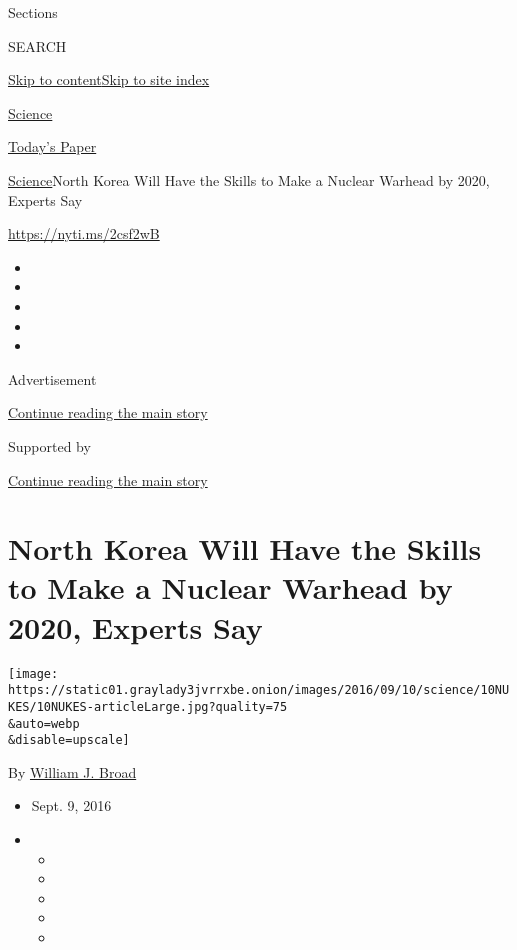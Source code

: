 Sections

SEARCH

\protect\hyperlink{site-content}{Skip to
content}\protect\hyperlink{site-index}{Skip to site index}

\href{https://www.nytimes3xbfgragh.onion/section/science}{Science}

\href{https://myaccount.nytimes3xbfgragh.onion/auth/login?response_type=cookie\&client_id=vi}{}

\href{https://www.nytimes3xbfgragh.onion/section/todayspaper}{Today's
Paper}

\href{/section/science}{Science}\textbar{}North Korea Will Have the
Skills to Make a Nuclear Warhead by 2020, Experts Say

\url{https://nyti.ms/2csf2wB}

\begin{itemize}
\item
\item
\item
\item
\item
\end{itemize}

Advertisement

\protect\hyperlink{after-top}{Continue reading the main story}

Supported by

\protect\hyperlink{after-sponsor}{Continue reading the main story}

\hypertarget{north-korea-will-have-the-skills-to-make-a-nuclear-warhead-by-2020-experts-say}{%
\section{North Korea Will Have the Skills to Make a Nuclear Warhead by
2020, Experts
Say}\label{north-korea-will-have-the-skills-to-make-a-nuclear-warhead-by-2020-experts-say}}

\texttt{[image: https://static01.graylady3jvrrxbe.onion/images/2016/09/10/science/10NUKES/10NUKES-articleLarge.jpg?quality=75\\\&auto=webp\\\&disable=upscale]}

By \href{http://www.nytimes3xbfgragh.onion/by/william-j-broad}{William
J. Broad}

\begin{itemize}
\item
  Sept. 9, 2016
\item
  \begin{itemize}
  \item
  \item
  \item
  \item
  \item
  \end{itemize}
\end{itemize}

